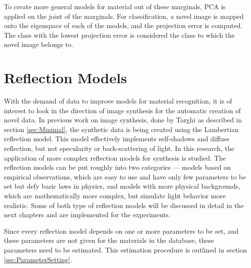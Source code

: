 To create more general models for material out of these marginals, PCA is applied on the joint of the marginals. For classification, a novel image is mapped onto the eigenspace of each of the models, and the projection error is computed. The class with the lowest projection error is considered the class to which the novel image belongs to. 

\section{Reflection Models}\label{sec:ReflectionModels}
With the demand of data to improve models for material recognition, it is of interest to look in the direction of image synthesis for the automatic creation of novel data. In previous work on image synthesis, done by Targhi as described in section \ref{sec:Minimal}, the synthetic data is being created using the Lambertian reflection model. This model effectively implements self-shadows and diffuse reflection, but not specularity or back-scattering of light. In this research, the application of more complex reflection models for synthesis is studied. The reflection models can be put roughly into two categories --- models based on empirical observations, which are easy to use and have only few parameters to be set but defy basic laws in physics, and models with more physical backgrounds, which are mathematically more complex, but simulate light behavior more realistic. Some of both type of reflection models will be discussed in detail in the next chapters and are implemented for the experiments.

Since every reflection model depends on one or more parameters to be set, and these parameters are not given for the materials in the database, these parameters need to be estimated. This estimation procedure is outlined in section \ref{sec:ParameterSetting}.


